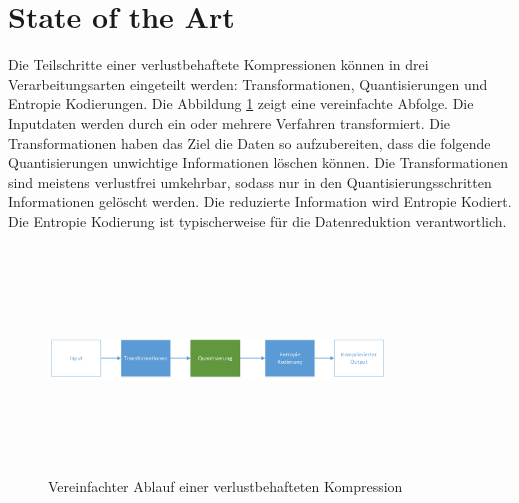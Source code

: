 \section{State of the Art}
Die Teilschritte einer verlustbehaftete Kompressionen können in drei Verarbeitungsarten eingeteilt werden: Transformationen, Quantisierungen und Entropie Kodierungen. Die Abbildung \ref{state:aufbau} zeigt eine vereinfachte Abfolge. Die Inputdaten werden durch ein oder mehrere Verfahren transformiert. Die Transformationen haben das Ziel die Daten so aufzubereiten, dass die folgende Quantisierungen unwichtige Informationen löschen können. Die Transformationen sind meistens verlustfrei umkehrbar, sodass nur in den Quantisierungsschritten Informationen gelöscht werden. Die reduzierte Information wird Entropie Kodiert. Die Entropie Kodierung ist typischerweise für die Datenreduktion verantwortlich.\\
\begin{figure}[!htbp]
	\center
	\includegraphics[width=0.8\textwidth,height=6cm,keepaspectratio]{./pictures/state/aufbau.png}
	\caption{Vereinfachter Ablauf einer verlustbehafteten Kompression}
	\label{state:aufbau}
\end{figure}

